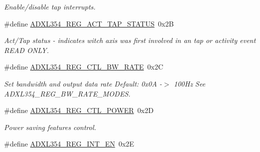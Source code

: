 \begin{DoxyCompactItemize}
\begin{DoxyCompactList}\small\item\em \-Enable/disable tap interrupts. \end{DoxyCompactList}\item 
\hypertarget{group___a_d_x_l354___r_e_g_i_s_t_e_r_s_ga975adc0f7d8d03af71c7483d8105de23}{\#define \hyperlink{group___a_d_x_l354___r_e_g_i_s_t_e_r_s_ga975adc0f7d8d03af71c7483d8105de23}{\-A\-D\-X\-L354\-\_\-\-R\-E\-G\-\_\-\-A\-C\-T\-\_\-\-T\-A\-P\-\_\-\-S\-T\-A\-T\-U\-S}~0x2\-B}\label{group___a_d_x_l354___r_e_g_i_s_t_e_r_s_ga975adc0f7d8d03af71c7483d8105de23}

\begin{DoxyCompactList}\small\item\em \-Act/\-Tap status -\/ indicates witch axis was first involved in an tap or activity event \-R\-E\-A\-D \-O\-N\-L\-Y. \end{DoxyCompactList}\item 
\hypertarget{group___a_d_x_l354___r_e_g_i_s_t_e_r_s_ga70d2be90d81a8f07ad4dcaad37c303f0}{\#define \hyperlink{group___a_d_x_l354___r_e_g_i_s_t_e_r_s_ga70d2be90d81a8f07ad4dcaad37c303f0}{\-A\-D\-X\-L354\-\_\-\-R\-E\-G\-\_\-\-C\-T\-L\-\_\-\-B\-W\-\_\-\-R\-A\-T\-E}~0x2\-C}\label{group___a_d_x_l354___r_e_g_i_s_t_e_r_s_ga70d2be90d81a8f07ad4dcaad37c303f0}

\begin{DoxyCompactList}\small\item\em \-Set bandwidth and output data rate \-Default\-: 0x0\-A -\/$>$ 100\-Hz \-See \-A\-D\-X\-L354\-\_\-\-R\-E\-G\-\_\-\-B\-W\-\_\-\-R\-A\-T\-E\-\_\-\-M\-O\-D\-E\-S. \end{DoxyCompactList}\item 
\hypertarget{group___a_d_x_l354___r_e_g_i_s_t_e_r_s_gacc12aae59ab72417eee3bdebcfaa3172}{\#define \hyperlink{group___a_d_x_l354___r_e_g_i_s_t_e_r_s_gacc12aae59ab72417eee3bdebcfaa3172}{\-A\-D\-X\-L354\-\_\-\-R\-E\-G\-\_\-\-C\-T\-L\-\_\-\-P\-O\-W\-E\-R}~0x2\-D}\label{group___a_d_x_l354___r_e_g_i_s_t_e_r_s_gacc12aae59ab72417eee3bdebcfaa3172}

\begin{DoxyCompactList}\small\item\em \-Power saving features control. \end{DoxyCompactList}\item 
\hypertarget{group___a_d_x_l354___r_e_g_i_s_t_e_r_s_gadf1a567fab98064226a9019ceda5f97e}{\#define \hyperlink{group___a_d_x_l354___r_e_g_i_s_t_e_r_s_gadf1a567fab98064226a9019ceda5f97e}{\-A\-D\-X\-L354\-\_\-\-R\-E\-G\-\_\-\-I\-N\-T\-\_\-\-E\-N}~0x2\-E}\label{group___a_d_x_l354___r_e_g_i_s_t_e_r_s_gadf1a567fab98064226a9019ceda5f97e}


\end{DoxyCompactItemize}
